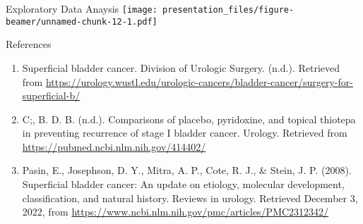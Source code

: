 \documentclass[
  ignorenonframetext,
]{beamer}
\begin{document}
\begin{frame}{Exploratory Data Anaysis}
\protect\hypertarget{exploratory-data-anaysis}{}
\texttt{[image: presentation\_files/figure-beamer/unnamed-chunk-12-1.pdf]}
\end{frame}

\begin{frame}{References}
\protect\hypertarget{references}{}
\begin{enumerate}
\item
  Superficial bladder cancer. Division of Urologic Surgery. (n.d.).
  Retrieved from
  \url{https://urology.wustl.edu/urologic-cancers/bladder-cancer/surgery-for-superficial-b/}
\item
  C;, B. D. B. (n.d.). Comparisons of placebo, pyridoxine, and topical
  thiotepa in preventing recurrence of stage I bladder cancer. Urology.
  Retrieved from \url{https://pubmed.ncbi.nlm.nih.gov/414402/}
\item
  Pasin, E., Josephson, D. Y., Mitra, A. P., Cote, R. J., \& Stein, J.
  P. (2008). Superficial bladder cancer: An update on etiology,
  molecular development, classification, and natural history. Reviews in
  urology. Retrieved December 3, 2022, from
  \url{https://www.ncbi.nlm.nih.gov/pmc/articles/PMC2312342/}
\end{enumerate}
\end{frame}
\end{document}
